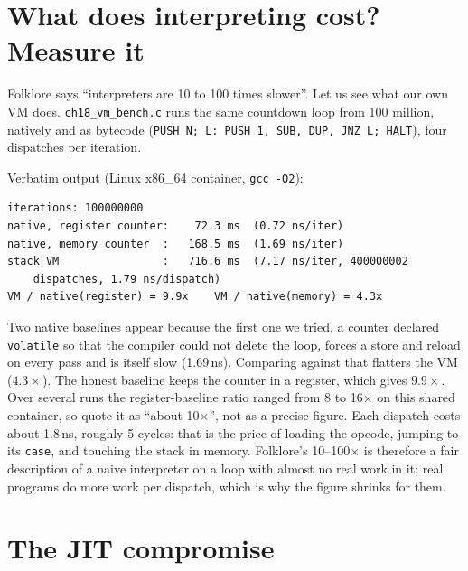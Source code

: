 \section{What does interpreting cost? Measure it}

Folklore says ``interpreters are 10 to 100 times slower''. Let us
see what our own VM does. \texttt{ch18\_vm\_bench.c} runs the same
countdown loop from 100 million, natively and as bytecode
(\texttt{PUSH N; L: PUSH 1, SUB, DUP, JNZ L; HALT}), four dispatches per iteration.



\begin{example}
Verbatim output (Linux x86\_64 container, \texttt{gcc -O2}):

{\scriptsize
\begin{verbatim}
iterations: 100000000
native, register counter:    72.3 ms  (0.72 ns/iter)
native, memory counter  :   168.5 ms  (1.69 ns/iter)
stack VM                :   716.6 ms  (7.17 ns/iter, 400000002
    dispatches, 1.79 ns/dispatch)
VM / native(register) = 9.9x    VM / native(memory) = 4.3x
\end{verbatim}
}
Two native baselines appear because the first one we tried, a
counter declared \texttt{volatile} so that the compiler could not delete the loop,
forces a store and reload on every pass and is itself slow
(1.69\,ns). Comparing against that flatters the VM ($4.3\times$). The honest baseline keeps the counter in a register,
which gives $9.9\times$. Over several runs the register-baseline ratio
ranged from 8 to 16$\times$ on this shared container, so quote it as ``about
10$\times$'', not as a precise figure. Each dispatch costs about 1.8\,ns, roughly 5
cycles: that is the price of loading the opcode, jumping to its
\texttt{case}, and touching the stack in memory. Folklore's 10--100$\times$ is therefore a
fair description of a naive interpreter on a loop with almost no real work in
it; real programs do more work per dispatch, which is why the figure
shrinks for them.
\end{example}

\section{The JIT compromise}

